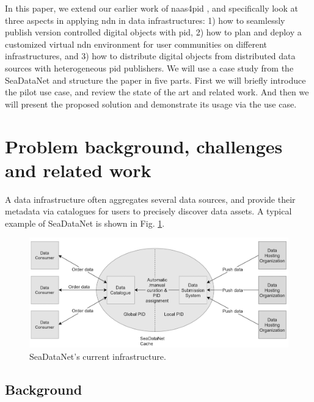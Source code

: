 \documentclass[conference]{IEEEtran}
\begin{document}
In this paper, we extend our earlier work of \gls{naas4pid} \cite{koulouzis2018information}, and specifically look at three aspects in applying \gls{ndn} in data infrastructures: 1) how to seamlessly publish version controlled digital objects with \gls{pid}, 2) how to plan and deploy a customized virtual \gls{ndn} environment for user communities on different infrastructures, and 3) how to distribute digital objects from distributed data sources with heterogeneous \gls{pid} publishers. We will use a case study from the SeaDataNet and structure the paper in five parts. First we will briefly introduce the pilot use case, and review the state of the art and related work. And then we will present the proposed solution and demonstrate its usage via the use case.




\section{Problem background, challenges and related work}
\label{problem-background}
A data infrastructure often aggregates several data sources, and provide their metadata via catalogues for users to precisely discover data assets. A typical example of SeaDataNet is shown in Fig. \ref{fig:sdc_cur}. 
\begin{figure}[H]
\centering
\includegraphics[width=\columnwidth]{images/SDC_current.png}
\caption{SeaDataNet's current infrastructure.}
\label{fig:sdc_cur}
\end{figure}
\subsection{Background}
\end{document}
